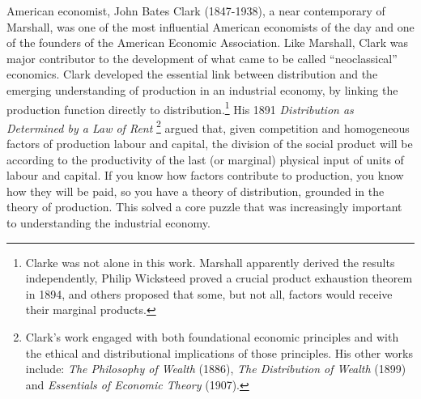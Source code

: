 American economist, John Bates Clark (1847-1938), a near contemporary of Marshall, was one of the most influential American economists of the day and one of the founders of the American Economic Association.  Like Marshall, Clark was major contributor to the development of what came to be called ``neoclassical'' economics. Clark developed the essential link between distribution and the emerging understanding of production in an industrial economy, by linking the production function directly to distribution.\footnote{Clarke was not alone in this work. Marshall apparently derived the results independently, Philip Wicksteed proved a crucial product exhaustion theorem in 1894, and others proposed that some, but not all, factors would receive their marginal products.} His 1891 \textit{Distribution as Determined by a Law of Rent} \cite{clarkDistributionDeterminedLaw1891}\footnote{Clark's work engaged with both foundational economic principles and with the ethical and distributional implications of those principles. His other works include: \textit{The Philosophy of Wealth} (1886), \textit{The Distribution of Wealth} (1899) and \textit{Essentials of Economic Theory} (1907).} argued that, given competition and homogeneous factors of production labour and capital, the division of the social product will be according to the productivity of the last (or marginal) physical input of units of labour and capital. 
If you know how factors contribute to production, you know how they will be paid, so you have a theory of distribution, grounded in the theory of production. 
This solved a core puzzle that was increasingly important to understanding the industrial economy.  


